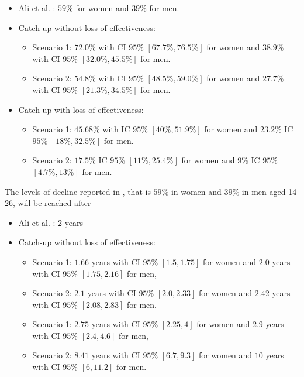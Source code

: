 \begin{itemize}
	\item Ali et al. \cite{ali2013genital}: $59\%$ for women and $39\%$ for men.
	\item Catch-up without loss of effectiveness:
	\begin{itemize}
	\item Scenario 1: $72.0\%$ with CI $95\%$ $[67.7\%, 76.5\%]$ for women and $38.9\%$ with CI $95\%$ $[32.0\%, 45.5\%]$ for men. 
	\item Scenario 2: $54.8\%$ with CI $95\%$ $[48.5\%, 59.0\%]$ for women and $27.7\%$ with CI $95\%$ $[21.3\%, 34.5\%]$ for men.
	\end{itemize} 
   	\item Catch-up with loss of effectiveness:
    \begin{itemize}
    	\item Scenario 1: $45.68\%$ with IC $95\%$ $[40\%, 51.9\%]$ for women and $23.2\%$ IC $95\%$ $[18\%, 32.5\%]$ for men.
    	\item Scenario 2: $17.5\%$ IC $95\%$ $[11\%, 25.4\%]$ for women and $9\%$ IC $95\%$ $[4.7\%, 13\% ]$ for men.
    \end{itemize} 
\end{itemize}

The levels of decline reported in \cite{ali2013genital}, that is $59\%$ in women and $39\%$ in men aged 14-26, will be reached after

\begin{itemize}
	\item Ali et al. \cite{ali2013genital}: 2 years
	\item Catch-up without loss of effectiveness:
	\begin{itemize}
	\item Scenario 1: $1.66$ years with CI $95\%$ $[1.5, 1.75]$ for women and $2.0$ years with CI $95\%$ $[1.75, 2.16]$ for men,
	\item Scenario 2: $2.1$ years with CI $95\%$ $[2.0, 2.33]$ for women and $2.42$ years with CI $95\%$ $[2.08, 2.83]$ for men.
	\end{itemize} 
	\begin{itemize}
	\item Scenario 1: $2.75$ years with CI $95\%$ $[2.25, 4]$ for women and $2.9$ years with CI $95\%$ $[2.4, 4.6]$ for men,
	\item Scenario 2: $8.41$ years with CI $95\%$ $[6.7, 9.3]$ for women and $10$ years with CI $95\%$ $[6, 11.2]$ for men.
	\end{itemize} 
\end{itemize}

